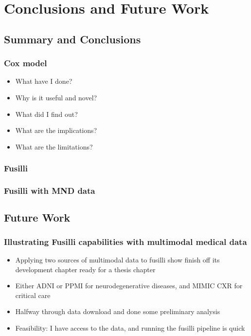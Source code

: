 \chapter{Conclusions and Future Work}
\label{conclusions_and_future_work}

\section{Summary and Conclusions}

\subsection{Cox model}
\begin{itemize}
    \item What have I done?
    \item Why is it useful and novel?
    \item What did I find out?
    \item What are the implications?
    \item What are the limitations?
\end{itemize}

\subsection{Fusilli}

\subsection{Fusilli with MND data}

\section{Future Work}

\subsection{Illustrating Fusilli capabilities with multimodal medical data}
\begin{itemize}
    \item Applying two sources of multimodal data to fusilli show finish off its development chapter ready for a thesis chapter
    \item Either ADNI or PPMI for neurodegenerative diseases, and MIMIC CXR for critical care
    \item Halfway through data download and done some preliminary analysis
    \item Feasibility: I have access to the data, and running the fusilli pipeline is quick
\end{itemize}

